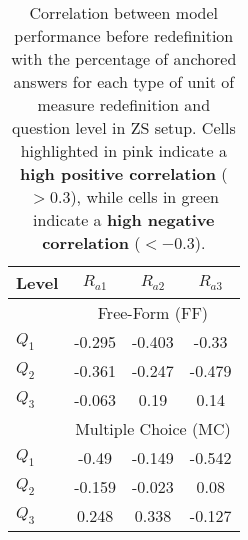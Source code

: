 \begin{table}[h!]
\small
    \centering
    \begin{tabular}{l|ccc}
        \hline
        Level & $R_{a1}$ & $R_{a2}$ & $R_{a3}$ \\ \hline
        & \multicolumn{3}{c}{Free-Form (FF)} \\ 
        \hline
        $Q_1$ & -0.295 & \cellcolor{lightdustygreen} -0.403   & \cellcolor{lightdustygreen} -0.33 \\ 
        $Q_2$ & \cellcolor{lightdustygreen} -0.361 & -0.247 & \cellcolor{lightdustygreen} -0.479 \\ 
        $Q_3$ & -0.063 & 0.19 & 0.14 \\
        
        \hline
        & \multicolumn{3}{c}{Multiple Choice (MC)} \\ \hline
        $Q_1$ & \cellcolor{lightdustygreen} -0.49 & -0.149  & \cellcolor{lightdustygreen} -0.542 \\ 
        $Q_2$ & -0.159 & -0.023 & 0.08 \\ 
        $Q_3$ & 0.248 & \cellcolor{lightdustypink} 0.338 & -0.127 \\

        \hline
    \end{tabular}
    \caption{Correlation between model performance before redefinition with the percentage of anchored answers for each type of unit of measure redefinition and question level in ZS setup. 
    Cells highlighted in \textcolor{lightdustypink}{pink} indicate a \textbf{high positive correlation} ($>0.3$), while cells in \textcolor{lightdustygreen}{green} indicate a \textbf{high negative correlation} ($<-0.3$).}
    \label{tab:correlation_zs-units}
\end{table}



